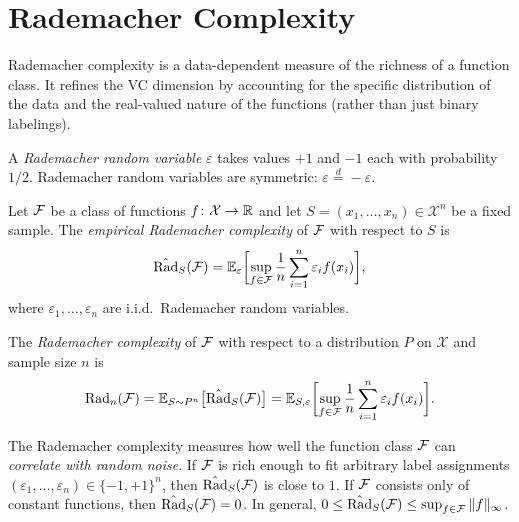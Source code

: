 \documentclass[11pt,a4paper]{article}
\begin{document}
\section{Rademacher Complexity}
\label{sec:rademacher}

Rademacher complexity is a data-dependent measure of the richness
of a function class.  It refines the VC dimension by accounting for
the specific distribution of the data and the real-valued nature
of the functions (rather than just binary labelings).

\begin{definition}
\label{def:rademacher-rv}
A \emph{Rademacher random variable} $\varepsilon$ takes values
$+1$ and $-1$ each with probability $1/2$.  Rademacher random
variables are symmetric: $\varepsilon \stackrel{d}{=} -\varepsilon$.
\end{definition}

\begin{definition}
\label{def:empirical-rademacher}
Let $\mathcal{F}$ be a class of functions $f \colon \mathcal{X} \to \mathbb{R}$
and let $S = (x_1, \ldots, x_n) \in \mathcal{X}^n$ be a fixed
sample.  The \emph{empirical Rademacher complexity} of $\mathcal{F}$
with respect to $S$ is
\[
  \hat{\mathrm{Rad}}_S(\mathcal{F}) = \mathbb{E}_{\varepsilon}\biggl[
    \sup_{f \in \mathcal{F}} \frac{1}{n} \sum_{i=1}^{n}
    \varepsilon_i f(x_i) \biggr],
\]
where $\varepsilon_1, \ldots, \varepsilon_n$ are i.i.d.\ Rademacher
random variables.
\end{definition}

\begin{definition}
\label{def:rademacher}
The \emph{Rademacher complexity} of $\mathcal{F}$ with respect to a
distribution $P$ on $\mathcal{X}$ and sample size $n$ is
\[
  \mathrm{Rad}_n(\mathcal{F}) = \mathbb{E}_{S \sim P^n}\bigl[
    \hat{\mathrm{Rad}}_S(\mathcal{F}) \bigr]
  = \mathbb{E}_{S, \varepsilon}\biggl[
    \sup_{f \in \mathcal{F}} \frac{1}{n} \sum_{i=1}^{n}
    \varepsilon_i f(x_i) \biggr].
\]
\end{definition}

\begin{remark}
\label{rem:rademacher-interpretation}
The Rademacher complexity measures how well the function class
$\mathcal{F}$ can \emph{correlate with random noise}.  If $\mathcal{F}$ is
rich enough to fit arbitrary label assignments
$(\varepsilon_1, \ldots, \varepsilon_n) \in \{-1, +1\}^n$, then
$\hat{\mathrm{Rad}}_S(\mathcal{F})$ is close to $1$.  If $\mathcal{F}$ consists only
of constant functions, then $\hat{\mathrm{Rad}}_S(\mathcal{F}) = 0$.  In general,
$0 \le \hat{\mathrm{Rad}}_S(\mathcal{F}) \le \sup_{f \in \mathcal{F}} \|f\|_\infty$.
\end{remark}
\end{document}
